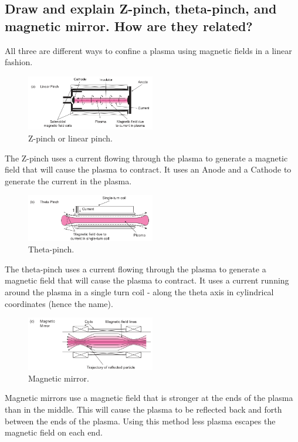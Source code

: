 \subsection{Draw and explain Z-pinch, theta-pinch, and magnetic mirror. How are they related?}
\begin{multisolutionblock}
All three are different ways to confine a plasma using magnetic fields in a linear fashion. 
\begin{figure}[H]
    \centering
    \includegraphics[width=0.5\textwidth]{chapters/fig/5_linear_pinch.png}
    \caption{Z-pinch or linear pinch.}
    \label{fig:z_theta_mirror}
\end{figure}
The Z-pinch uses a current flowing through the plasma to generate a magnetic field that will cause the plasma to contract. It uses an Anode and a Cathode to generate the current in the plasma. 
\begin{figure}[H]
    \centering
    \includegraphics[width=0.5\textwidth]{chapters/fig/5_theta_pinch.png}
    \caption{Theta-pinch.}
    \label{fig:theta-pinch}
\end{figure}
The theta-pinch uses a current flowing through the plasma to generate a magnetic field that will cause the plasma to contract. It uses a current running around the plasma in a single turn coil - along the theta axis in cylindrical coordinates (hence the name). 
\begin{figure}[H]
    \centering
    \includegraphics[width=0.5\textwidth]{chapters/fig/5_magnetic_mirror.png}
    \caption{Magnetic mirror.}
    \label{fig:magnetic_mirror}
\end{figure}
Magnetic mirrors use a magnetic field that is stronger at the ends of the plasma than in the middle. This will cause the plasma to be reflected back and forth between the ends of the plasma. Using this method less plasma escapes the magnetic field on each end.
\end{multisolutionblock}

